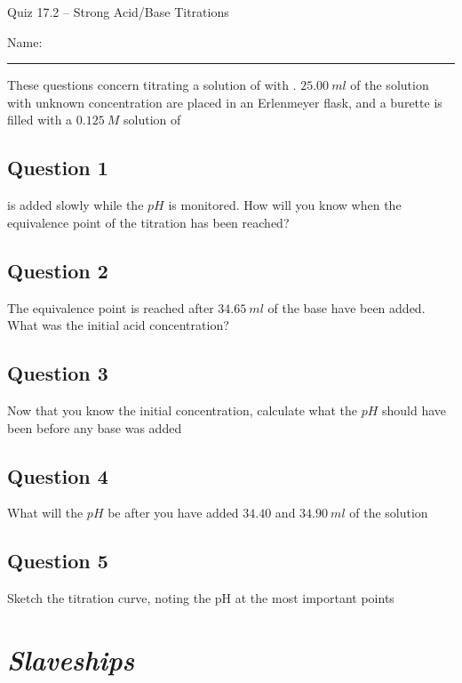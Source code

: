 \documentclass[11pt, letterpaper]{memoir}
\begin{document}
	\begin{center}
		{\large	Quiz 17.2 -- Strong Acid/Base Titrations}
	\end{center}
	{\large Name: \rule[-1mm]{4in}{.1pt} 

	\noindent These questions concern titrating a solution of  with . $25.00~ml$ of the  solution with unknown concentration are placed in an Erlenmeyer flask, and a burette is filled with a $0.125~M$ solution of 
	\subsection*{Question 1}
	 is added slowly while the $pH$ is monitored. How will you know when the equivalence point of the titration has been reached?
	
	\vspace{3em}
	\subsection*{Question 2}
	The equivalence point is reached after $34.65~ml$ of the base have been added. \\What was the initial acid concentration?
	
	\vspace{3em}
	\subsection*{Question 3}
	Now that you know the initial concentration, calculate what the $pH$ should have been before any base was added
	
	\vspace{3em}
	\subsection*{Question 4}
	What will the $pH$ be after you have added $34.40$ and $34.90~ml$ of the  solution
	
	\vspace{6em}
	\subsection*{Question 5}
	Sketch the titration curve, noting the pH at the most important points
	\newpage
	\pagestyle{empty}
	\addtocounter{page}{-1}
\section*{\emph{Slaveships}}
}
\end{document}
